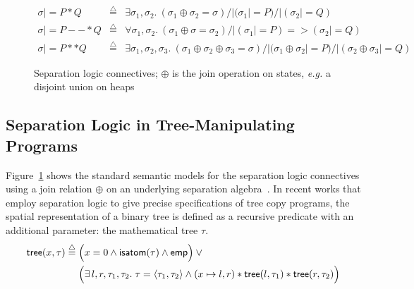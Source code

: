 \documentclass[acmsmall,screen]{acmart}
\newcommand{\scon}{\mathbin{\star}}
\renewcommand{\scon}{\mathbin{\ast}} \renewcommand{\bigstar}{\raisebox{-0.24em}{{\scaleobj{2.5}{\scon}}}}
\newcommand{\defeq}{\mathbin{\stackrel{\triangle}{=}}}
\begin{document}
\begin{figure}
{\footnotesize
\[
\begin{array}{lcl}
\sigma |= P * Q & \defeq & \exists \sigma_1, \sigma_2.~ (\sigma_1 \oplus \sigma_2 = \sigma) /| (\sigma_1 |= P) /| (\sigma_2 |= Q)\\
\sigma |= P --* Q & \defeq & \forall \sigma_1, \sigma_2.~ (\sigma_1 \oplus \sigma = \sigma_2) /| (\sigma_1 |= P) => (\sigma_2 |= Q) \\
\sigma |= P ** Q & \defeq & \exists \sigma_1, \sigma_2, \sigma_3.~ (\sigma_1 \oplus \sigma_2 \oplus \sigma_3 = \sigma) /| (\sigma_1 \oplus \sigma_2 |= P) /| (\sigma_2 \oplus \sigma_3 |= Q)
\end{array}
\]
}
\vspace{-1em}
\caption{Separation logic connectives; $\oplus$ is the join operation on states, \emph{e.g.} a disjoint union on heaps}
\label{fig:seplogsem}
\vspace*{-1em}
\end{figure}  
\subsection{Separation Logic in Tree-Manipulating Programs}
\label{sec:seplogtrees}

Figure~\ref{fig:seplogsem} shows the standard semantic models for the separation logic connectives using a join relation $\oplus$ on an underlying separation algebra~\cite{dockins09}. In recent works \citep{o2001local, o2012primer}
that employ separation logic to give
precise specifications of tree copy programs, the spatial
representation of a binary tree is defined as a recursive predicate
with an additional parameter: the mathematical tree $\tau$.
\begin{equation}\label{def:tree}
\begin{split}
    \mathsf{tree}(x, \tau)\;\defeq\;
    &\Big(x=0 \wedge \mathsf{isatom}(\tau) \wedge \mathsf{emp}\Big)
    \vee \null \\ &\Big(\exists\,l,r,\tau_1,\tau_2.\; \tau=\langle \tau_1,
    \tau_2 \rangle \wedge (x \mapsto l,r) \scon
    \mathsf{tree}(l, \tau_1) \scon \mathsf{tree}(r, \tau_2)\Big)
    \end{split}
\end{equation}
\end{document}
